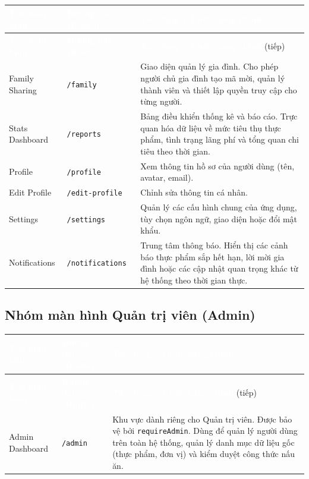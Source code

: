 \documentclass[12pt,a4paper]{article}
\newcommand{\code}[1]{\texttt{#1}}
\newcommand{\thead}[1]{\textbf{\textcolor{white}{#1}}}
\begin{document}
\begin{longtable}{|>{\raggedright\arraybackslash}p{3.5cm}|>{\raggedright\arraybackslash}p{4cm}|>{\raggedright\arraybackslash}p{7.5cm}|}
\hline
\rowcolor{headerblue}
\thead{Tên màn hình} & \thead{Đường dẫn (Route)} & \thead{Tác dụng / Chức năng chính} \\
\hline
\endfirsthead
\hline
\rowcolor{headerblue}
\thead{Tên màn hình} & \thead{Đường dẫn (Route)} & \thead{Tác dụng / Chức năng chính} (tiếp) \\
\hline
\endhead
Family Sharing & \code{/family} & Giao diện quản lý gia đình. Cho phép người chủ gia đình tạo mã mời, quản lý thành viên và thiết lập quyền truy cập cho từng người. \\
\hline
Stats Dashboard & \code{/reports} & Bảng điều khiển thống kê và báo cáo. Trực quan hóa dữ liệu về mức tiêu thụ thực phẩm, tình trạng lãng phí và tổng quan chi tiêu theo thời gian. \\
\hline
Profile & \code{/profile} & Xem thông tin hồ sơ của người dùng (tên, avatar, email). \\
\hline
Edit Profile & \code{/edit-profile} & Chỉnh sửa thông tin cá nhân. \\
\hline
Settings & \code{/settings} & Quản lý các cấu hình chung của ứng dụng, tùy chọn ngôn ngữ, giao diện hoặc đổi mật khẩu. \\
\hline
Notifications & \code{/notifications} & Trung tâm thông báo. Hiển thị các cảnh báo thực phẩm sắp hết hạn, lời mời gia đình hoặc các cập nhật quan trọng khác từ hệ thống theo thời gian thực. \\
\hline
\end{longtable}

\subsection{Nhóm màn hình Quản trị viên (Admin)}

\begin{longtable}{|>{\raggedright\arraybackslash}p{3.5cm}|>{\raggedright\arraybackslash}p{4cm}|>{\raggedright\arraybackslash}p{7.5cm}|}
\hline
\rowcolor{headerblue}
\thead{Tên màn hình} & \thead{Đường dẫn (Route)} & \thead{Tác dụng / Chức năng chính} \\
\hline
\endfirsthead
\hline
\rowcolor{headerblue}
\thead{Tên màn hình} & \thead{Đường dẫn (Route)} & \thead{Tác dụng / Chức năng chính} (tiếp) \\
\hline
\endhead
Admin Dashboard & \code{/admin} & Khu vực dành riêng cho Quản trị viên. Được bảo vệ bởi \code{requireAdmin}. Dùng để quản lý người dùng trên toàn hệ thống, quản lý danh mục dữ liệu gốc (thực phẩm, đơn vị) và kiểm duyệt công thức nấu ăn. \\
\hline
\end{longtable}
\end{document}
